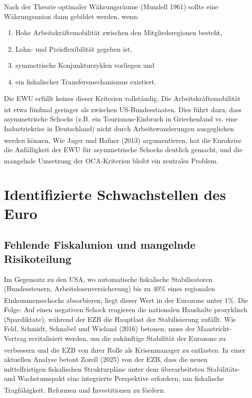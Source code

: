 \documentclass[12pt,a4paper]{article}
\newcommand{\footcite}[1]{\textsuperscript{\cite{#1}}}
\begin{document}
	Nach der Theorie optimaler Währungsräume (Mundell 1961) sollte eine Währungsunion dann gebildet werden, wenn:
	\begin{enumerate}
		\item Hohe Arbeitskräftemobilität zwischen den Mitgliedsregionen besteht,
		\item Lohn- und Preisflexibilität gegeben ist,
		\item symmetrische Konjunkturzyklen vorliegen und
		\item ein fiskalischer Transfersmechanismus existiert.
	\end{enumerate}
	
	Die EWU erfüllt keines dieser Kriterien vollständig. Die Arbeitskräftemobilität ist etwa fünfmal geringer als zwischen US-Bundesstaaten.\footcite{Feld2016} Dies führt dazu, dass asymmetrische Schocks (z.B. ein Tourismus-Einbruch in Griechenland vs. eine Industriekrise in Deutschland) nicht durch Arbeitswanderungen ausgeglichen werden können.\footcite{JagerHafner2013} Wie Jager und Hafner (2013) argumentieren, hat die Eurokrise die Anfälligkeit der EWU für asymmetrische Schocks deutlich gemacht, und die mangelnde Umsetzung der OCA-Kriterien bleibt ein zentrales Problem.\footcite{JagerHafner2013}
	
	\section{Identifizierte Schwachstellen des Euro}
	
	\subsection{Fehlende Fiskalunion und mangelnde Risikoteilung}
	
	Im Gegensatz zu den USA, wo automatische fiskalische Stabilisatoren (Bundessteuern, Arbeitslosenversicherung) bis zu 40\% eines regionalen Einkommensschocks absorbieren, liegt dieser Wert in der Eurozone unter 1\%.\footcite{DeGrauwe2020} Die Folge: Auf einen negativen Schock reagieren die nationalen Haushalte prozyklisch (Spardiktate), während der EZB die Hauptlast der Stabilisierung zufällt. Wie Feld, Schmidt, Schnabel und Wieland (2016) betonen, muss der Maastricht-Vertrag revitalisiert werden, um die zukünftige Stabilität der Eurozone zu verbessern und die EZB von ihrer Rolle als Krisenmanager zu entlasten.\footcite{Feld2016a} In einer aktuellen Analyse betont Zorell (2025) von der EZB, dass die neuen mittelfristigen fiskalischen Strukturpläne unter dem überarbeiteten Stabilitäts- und Wachstumspakt eine integrierte Perspektive erfordern, um fiskalische Tragfähigkeit, Reformen und Investitionen zu fördern.\footcite{Zorell2025}
	
\end{document}

